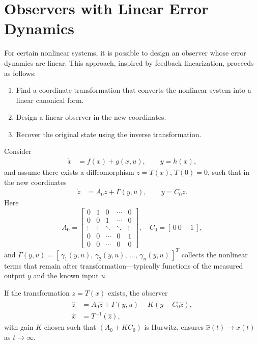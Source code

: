 \section{Observers with Linear Error Dynamics}

For certain nonlinear systems, it is possible to design an observer whose error dynamics are linear.  
This approach, inspired by feedback linearization, proceeds as follows:
\begin{enumerate}
    \item Find a coordinate transformation that converts the nonlinear system into a linear canonical form.
    \item Design a linear observer in the new coordinates.
    \item Recover the original state using the inverse transformation.
\end{enumerate}

\noindent Consider
\begin{align}
    \dot{x} &= f(x) + g(x,u), \qquad y = h(x), \label{eq:nonlinear_obs_lin}
\end{align}
and assume there exists a diffeomorphism \( z = T(x) \), \(T(0)=0\), such that in the new coordinates
\begin{align}
    \dot{z} &= A_0 z + \Gamma(y,u), \qquad y = C_0 z. \label{eq:linearized_obs_form}
\end{align}
Here
\[
A_0 =
\begin{bmatrix}
0 & 1 & 0 & \cdots & 0\\
0 & 0 & 1 & \cdots & 0\\
\vdots & \vdots & \ddots & \ddots & \vdots\\
0 & 0 & \cdots & 0 & 1\\
0 & 0 & \cdots & 0 & 0
\end{bmatrix},
\quad
C_0 = [\,0~0~\cdots~1\,],
\]
and \(\Gamma(y,u) = [\,\gamma_1(y,u),\,\gamma_2(y,u),\,\ldots,\,\gamma_n(y,u)\,]^T\) collects the nonlinear terms that remain after transformation—typically functions of the measured output \(y\) and the known input \(u\).

\begin{theorem}
If the transformation \(z=T(x)\) exists, the observer
\begin{align}
    \dot{\hat{z}} &= A_0 \hat{z} + \Gamma(y,u) - K(y - C_0 \hat{z}), \label{eq:nonlinear_linear_error_obs}\\
    \hat{x} &= T^{-1}(\hat{z}),
\end{align}
with gain \(K\) chosen such that \((A_0 + K C_0)\) is Hurwitz, ensures \(\hat{x}(t) \to x(t)\) as \(t \to \infty\).
\end{theorem}

